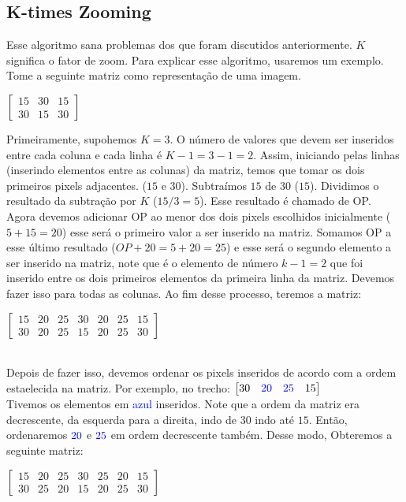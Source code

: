 \documentclass[a4paper, 12pt]{article}
\begin{document}
\subsection{K-times Zooming}
Esse algoritmo sana problemas dos que foram discutidos anteriormente. $K$ significa o fator de zoom.
Para explicar esse algoritmo, usaremos um exemplo. Tome a seguinte matriz como representação de uma imagem.
\begin{table}[!htbp]
	\centering
	$
	\begin{bmatrix}
	15 & 30 & 15 \\
	30 & 15 & 30
	\end{bmatrix}
	$
\end{table}
Primeiramente, supohemos $K = 3$. O número de valores que devem ser inseridos entre cada coluna e cada linha é $K - 1 = 3 - 1 = 2$.
Assim, iniciando pelas linhas (inserindo elementos entre as colunas) da matriz, temos que tomar os dois primeiros pixels 
adjacentes. ($15$ e $30$).
Subtraímos $15$ de $30$ ($15$). Dividimos o resultado da subtração por $K$ ($15/3 = 5$). Esse resultado é chamado de OP.
Agora devemos adicionar OP ao menor dos dois pixels escolhidos inicialmente ($5 + 15 = 20$) esse será o primeiro valor 
a ser inserido na matriz. Somamos OP a esse último resultado ($OP + 20 = 5 + 20 = 25$) e esse será o segundo elemento a ser
inserido na matriz, note que é o elemento de número $k - 1 = 2$ que foi inserido entre os dois primeiros elementos da primeira 
linha da matriz. Devemos fazer isso para todas as colunas. Ao fim desse processo, teremos a matriz:
\begin{table}[!htbp]
	\centering
	$
	\begin{bmatrix}
	15 & 20 & 25 & 30 & 20 & 25 & 15 \\
	30 & 20 & 25 & 15 & 20 & 25 & 30
	\end{bmatrix}
	$
\end{table}
\\
Depois de fazer isso, devemos ordenar os pixels inseridos de acordo com a ordem estaelecida na matriz. Por exemplo, no trecho:
$\begin{bmatrix}
	30 & \textcolor{blue}{20} & \textcolor{blue}{25} & 15	
\end{bmatrix}
$
\\
Tivemos os elementos em \textcolor{blue}{azul} inseridos. Note que a ordem da matriz era decrescente, da esquerda para a direita, indo 
de $30$ indo até $15$. Então, ordenaremos $\textcolor{blue}{20}$ e $\textcolor{blue}{25}$ em ordem decrescente também. Desse modo, 
Obteremos a seguinte matriz:
\begin{table}[!htbp]
	\centering
	$
	\begin{bmatrix}
	15 & 20 & 25 & 30 & 25 & 20 & 15 \\
	30 & 25 & 20 & 15 & 20 & 25 & 30
	\end{bmatrix}
	$
\end{table}
\\
\end{document}
